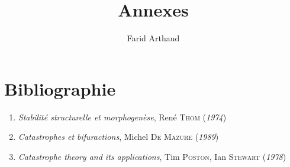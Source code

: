 \documentclass[a4paper]{article}
\theoremstyle{definition}
\begin{document}
\setcounter{page}{7}
\title{Annexes}
\author{Farid Arthaud}
\maketitle
\tableofcontents

\section{Bibliographie}
\begin{enumerate}
	\item \textit{Stabilité structurelle et morphogenèse}, René \textsc{Thom} (\textit{1974})
	\item \textit{Catastrophes et bifuractions}, Michel \textsc{De Mazure} (\textit{1989})
	\item \textit{Catastrophe theory and its applications}, Tim \textsc{Poston}, Ian \textsc{Stewart} (\textit{1978})
\end{enumerate}
\end{document}
